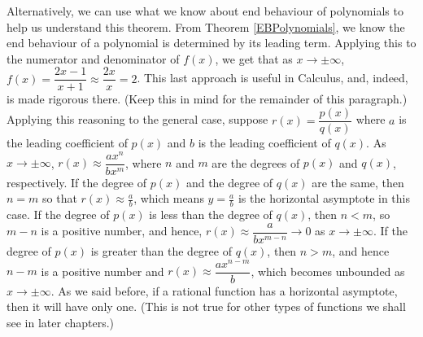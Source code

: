 \smallskip

Alternatively, we can use what we know about end behaviour of polynomials to help us understand this theorem.  From Theorem \ref{EBPolynomials}, we know the end behaviour of a polynomial is determined by its leading term.  Applying this to the numerator and denominator of $f(x)$, we get that as $x \rightarrow \pm \infty$, $f(x) = \dfrac{2x-1}{x+1} \approx \dfrac{2x}{x} = 2$.  This last approach is useful in Calculus, and, indeed, is made rigorous there.  (Keep this in mind for the remainder of this paragraph.)  Applying this reasoning to the general case, suppose $r(x) = \dfrac{p(x)}{q(x)}$ where $a$ is the leading coefficient of $p(x)$ and $b$ is the leading coefficient of $q(x)$. As $x \rightarrow \pm \infty$, $r(x) \approx \dfrac{ax^n}{bx^m}$, where $n$ and $m$ are the degrees of $p(x)$ and $q(x)$, respectively.  If the degree of $p(x)$ and the degree of $q(x)$ are the same, then $n=m$ so that $r(x) \approx \frac{a}{b}$, which means $y=\frac{a}{b}$ is the horizontal asymptote in this case.  If the degree of $p(x)$ is less than the degree of $q(x)$, then $n < m$, so $m-n$ is a positive number, and hence, $r(x) \approx \dfrac{a}{bx^{m-n}} \rightarrow 0$ as $x \rightarrow \pm \infty$.  If the degree of $p(x)$ is greater than the degree of $q(x)$, then $n > m$, and hence $n-m$ is a positive number and $r(x) \approx \dfrac{ax^{n-m}}{ b}$, which becomes unbounded as $x \rightarrow \pm \infty$.  As we said before, if a rational function has a horizontal asymptote, then it will have only one.  (This is not true for other types of functions we shall see in later chapters.)
 
\pagebreak


